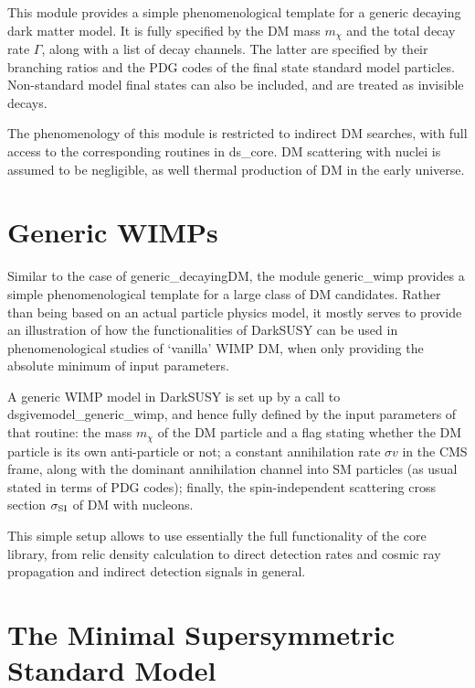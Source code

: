 \documentclass[a4paper,10pt,oneside]{book}
\newcommand{\code}[1]{\ft{#1}}
\newcommand{\ft}[1]{\textsf{#1}}
\begin{document}
This module provides a simple phenomenological template 
for a generic decaying dark matter model. It is fully specified by
the DM mass $m_\chi$ and the total decay rate $\Gamma$, 
along with a list of decay channels. The latter are specified by their
branching ratios and the PDG codes of the final state standard 
model particles. Non-standard model final states can
also be included, and are treated as invisible decays.

The phenomenology of this module is restricted to indirect 
DM searches, with full access to the corresponding routines 
in \code{ds\_core}. DM scattering with nuclei is assumed to be 
negligible, as well thermal production of DM in the early universe.



\chapter{Generic WIMPs}
\label{ch:genWIMP}

Similar to the case of \code{generic\_decayingDM}, the module \code{generic\_wimp} provides 
a simple phenomenological template for a large class of DM candidates. Rather than being based 
on an actual particle physics model, it mostly serves to provide an illustration of how the functionalities 
of DarkSUSY can be used in phenomenological studies of ‘vanilla’ WIMP DM, when only providing 
the absolute minimum of input parameters.

A generic WIMP model in DarkSUSY is set up by a call to \code{dsgivemodel\_generic\_wimp}, 
and hence fully defined by the input parameters of that routine: the mass $m_\chi$ of the DM particle 
and a flag stating whether the DM particle is its own anti-particle or not; a constant annihilation 
rate $\sigma v$ in the CMS frame, along with the dominant annihilation channel into SM particles
(as usual stated in terms of PDG codes); finally, the spin-independent 
scattering cross section $\sigma_{\rm SI}$ of DM with nucleons.

This simple setup allows to use essentially the full functionality of the \code{core} library,
from relic density calculation to direct detection rates and cosmic ray propagation and
indirect detection signals in general.
\chapter{The Minimal Supersymmetric Standard Model}
\end{document}
